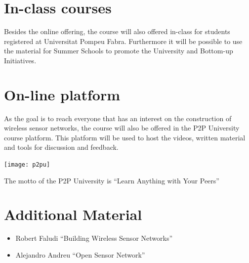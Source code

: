 \documentclass{tufte-book} %
\begin{document}


\section{In-class courses}
Besides the online offering, the course will also offered in-class for students registered at Universitat Pompeu Fabra.
Furthermore it will be possible to use the material for Summer Schools to promote the University and Bottom-up Initiatives.

\section{On-line platform}

As the goal is to reach everyone that has an interest on the construction of wireless sensor networks, the course will also be offered in the P2P University course platform.
This platform will be used to host the videos, written material and tools for discussion and feedback.

\begin{marginfigure}
\texttt{[image: p2pu]}
\caption{The motto of the P2P University is ``Learn Anything with Your Peers''}
\label{fig:p2pu}
\end{marginfigure}

\section{Additional Material}

\begin{itemize}
\item Robert Faludi ``Building Wireless Sensor Networks''
\item Alejandro Andreu ``Open Sensor Network''
\end{itemize}
\end{document}
